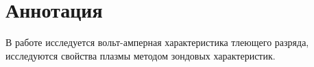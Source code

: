 \section*{Аннотация}

В работе исследуется вольт-амперная характеристика тлеющего разряда, исследуются свойства плазмы методом зондовых характеристик.